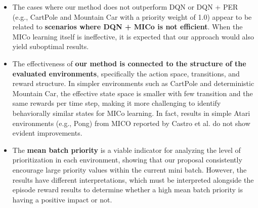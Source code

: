 \begin{itemize}
    \item The cases where our method does not outperform DQN or DQN + PER (e.g., CartPole and Mountain Car with a priority weight of 1.0) appear to be related to \textbf{scenarios where DQN + MICo is not efficient}. When the MICo learning itself is ineffective, it is expected that our approach would also yield suboptimal results.
    \item The effectiveness of \textbf{our method is connected to the structure of the evaluated environments}, specifically the action space, transitions, and reward structure. In simpler environments such as CartPole and deterministic Mountain Car, the effective state space is smaller with few transition and the same rewards per time step, making it more challenging to identify behaviorally similar states for MICo learning.  In fact, results in simple Atari environments (e.g., Pong) from MICO reported by Castro et al. \cite{castro2021mico} do not show evident improvements.
    \item The \textbf{mean batch priority} is a viable indicator for analyzing the level of prioritization in each environment, showing that our proposal consistently encourage large priority values within the current mini batch. However, the results have different interpretations, which must be interpreted alongside the episode reward results to determine whether a high mean batch priority is having a positive impact or not.
\end{itemize}



